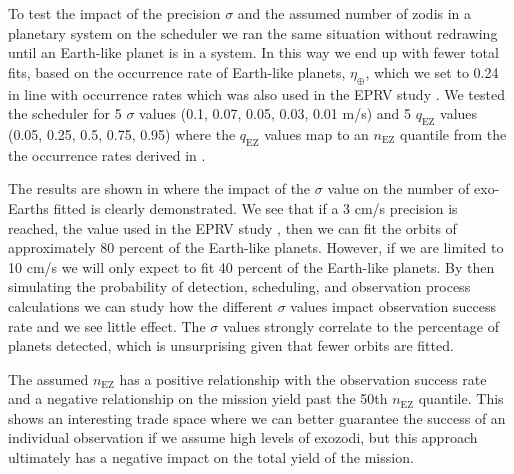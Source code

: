 To test the impact of the precision $\sigma$ and the assumed number of zodis in
a planetary system on the scheduler we ran the same situation without redrawing
until an Earth-like planet is in a system. In this way we end up with fewer
total fits, based on the occurrence rate of Earth-like planets,
$\eta_{\oplus}$, which we set to 0.24 in line with
\citep{dulzJointRadialVelocity2020} occurrence rates which was also used in the
EPRV study \citet{morganExplorationExpectedNumber2022a}. We tested the
scheduler for 5 $\sigma$ values (0.1, 0.07, 0.05, 0.03, 0.01 m/s) and 5
$q_\textrm{EZ}$ values (0.05, 0.25, 0.5, 0.75, 0.95) where the $q_\textrm{EZ}$
values map to an $n_\textrm{EZ}$ quantile from the the occurrence rates derived
in \citet{ertelHOSTSSurvey2020}.

The results are shown in  where the impact of
the $\sigma$ value on the number of exo-Earths fitted is clearly demonstrated.
We see that if a 3 cm/s precision is reached, the value used in the EPRV study
\citet{morganExplorationExpectedNumber2022a}, then we can fit the orbits of
approximately 80 percent of the Earth-like planets. However, if we are limited
to 10 cm/s we will only expect to fit 40 percent of the Earth-like planets. By
then simulating the probability of detection, scheduling, and observation
process calculations we can study how the different $\sigma$ values impact
observation success rate and we see little effect. The $\sigma$ values strongly
correlate to the percentage of planets detected, which is unsurprising given
that fewer orbits are fitted.

The assumed $n_\textrm{EZ}$ has a positive relationship with the observation
success rate and a negative relationship on the mission yield past the 50th
$n_\textrm{EZ}$ quantile. This shows an interesting trade space where we can
better guarantee the success of an individual observation if we assume high
levels of exozodi, but this approach ultimately has a negative impact on the
total yield of the mission.

